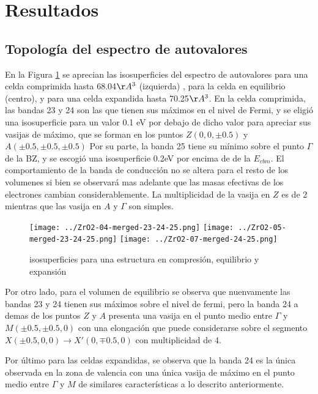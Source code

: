 \section{Resultados}

\subsection{Topología del espectro de autovalores}
En la Figura \ref{FigureIsosurfaces} se aprecian las isosuperficies del espectro de autovalores para
una celda comprimida hasta  68.04$\AA^3$ (izquierda) , para la celda en equilibrio (centro), y para una celda
expandida hasta 70.25$\AA^3$.  
En la celda comprimida, las bandas 23 y 24 son las que tienen sus máximos en el nivel de Fermi, 
y se eligió una isosuperficie para un valor 0.1 eV por debajo de dicho valor para apreciar sus vasijas de
máximo, que se forman en los puntos $Z (0, 0, \pm0.5)$ y $A (\pm0.5,\pm 0.5, \pm0.5)$ Por su parte, la 
banda 25 tiene su mínimo sobre el punto $\Gamma$ de la BZ, y se escogió una isosuperficie 0.2eV por 
encima de de la $E_{cbm}$. El comportamiento de la banda de conducción no se altera para 
el resto de los volumenes si bien se observará mas adelante que las masas efectivas de los electrones 
cambian considerablemente. La multiplicidad de la vasija en $Z$ es de 2 mientras que las
vasija en $A$ y $\Gamma$ son simples.

\begin{figure}
  \center
  \texttt{[image: ../ZrO2-04-merged-23-24-25.png]}
  \texttt{[image: ../ZrO2-05-merged-23-24-25.png]}
  \texttt{[image: ../ZrO2-07-merged-24-25.png]}
  \caption{\protect\label{FigureIsosurfaces}
  isosuperficies  para una estructura en compresión, equilibrio y expansión}
\end{figure}

Por otro lado, para el volumen de equilibrio se observa que nuenvamente las bandas  23 y 24 
tienen sus máximos sobre el nivel de fermi, pero la banda 24 a demas de los puntos $Z$ y $A$
presenta una vasija en el punto medio entre $\Gamma$ y $M (\pm0.5, \pm0.5, 0)$ con una 
elongación que puede considerarse sobre el segmento $X (\pm0.5, 0, 0) \rightarrow X' (0, \mp0.5, 0)$ con 
multiplicidad de 4. 

Por último para las celdas expandidas, se observa que la banda 24 es la única observada en 
la zona de valencia con una única vasija de máximo en el punto medio entre $\Gamma$ y $M$ de 
similares características a lo descrito anteriormente.

